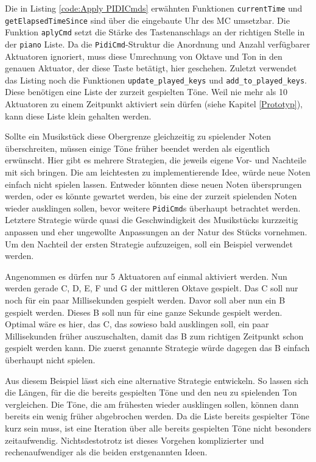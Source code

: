 Die in Listing \ref{code:Apply PIDICmds} erwähnten Funktionen \lstinline{currentTime} und \lstinline{getElapsedTimeSince} sind über die eingebaute Uhr des \ac{MC} umsetzbar.
Die Funktion \lstinline{aplyCmd} setzt die Stärke des Tastenanschlags an der richtigen Stelle in der \lstinline{piano} Liste.
Da die \lstinline{PidiCmd}-Struktur die Anordnung und Anzahl verfügbarer Aktuatoren ignoriert, muss diese Umrechnung von Oktave und Ton in den genauen Aktuator, der diese Taste betätigt, hier geschehen. \newline
Zuletzt verwendet das Listing noch die Funktionen \lstinline{update_played_keys} und \lstinline{add_to_played_keys}.
Diese benötigen eine Liste der zurzeit gespielten Töne.
Weil nie mehr als 10 Aktuatoren zu einem Zeitpunkt aktiviert sein dürfen (siehe Kapitel \ref{Prototyp}), kann diese Liste klein gehalten werden.

Sollte ein Musikstück diese Obergrenze gleichzeitig zu spielender Noten überschreiten, müssen einige Töne früher beendet werden als eigentlich erwünscht. \newline
Hier gibt es mehrere Strategien, die jeweils eigene Vor- und Nachteile mit sich bringen.
Die am leichtesten zu implementierende Idee, würde neue Noten einfach nicht spielen lassen.
Entweder könnten diese neuen Noten übersprungen werden, oder es könnte gewartet werden, bis eine der zurzeit spielenden Noten wieder ausklingen sollen, bevor weitere \lstinline{PidiCmd}s überhaupt betrachtet werden.
Letztere Strategie würde quasi die Geschwindigkeit des Musikstücks kurzzeitig anpassen und eher ungewollte Anpassungen an der Natur des Stücks vornehmen.
Um den Nachteil der ersten Strategie aufzuzeigen, soll ein Beispiel verwendet werden.

Angenommen es dürfen nur 5 Aktuatoren auf einmal aktiviert werden.
Nun werden gerade C, D, E, F und G der mittleren Oktave gespielt.
Das C soll nur noch für ein paar Millisekunden gespielt werden.
Davor soll aber nun ein B gespielt werden.
Dieses B soll nun für eine ganze Sekunde gespielt werden.
Optimal wäre es hier, das C, das sowieso bald ausklingen soll, ein paar Millisekunden früher auszuschalten, damit das B zum richtigen Zeitpunkt schon gespielt werden kann.
Die zuerst genannte Strategie würde dagegen das B einfach überhaupt nicht spielen.

Aus diesem Beispiel lässt sich eine alternative Strategie entwickeln.
So lassen sich die Längen, für die die bereits gespielten Töne und den neu zu spielenden Ton vergleichen.
Die Töne, die am frühesten wieder ausklingen sollen, können dann bereits ein wenig früher abgebrochen werden.
Da die Liste bereits gespielter Töne kurz sein muss, ist eine Iteration über alle bereits gespielten Töne nicht besonders zeitaufwendig.
Nichtsdestotrotz ist dieses Vorgehen komplizierter und rechenaufwendiger als die beiden erstgenannten Ideen.

